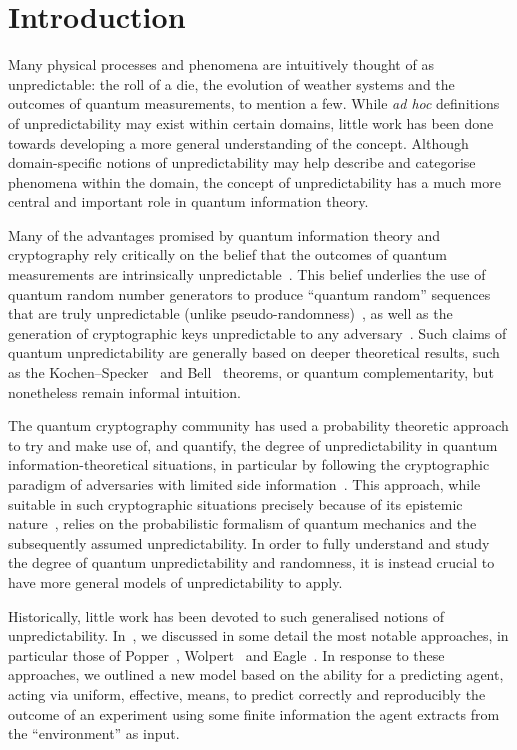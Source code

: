 \documentclass[information,article,accept,moreauthors,pdftex,12pt,a4paper]{mdpi}
\theoremstyle{mdpi}
\newcounter{ex}
\newcounter{re}
\theoremstyle{mdpidefinition}
\begin{document}
\section{Introduction}

Many physical processes and phenomena are intuitively thought of as unpredictable: the roll of a die, the evolution of weather systems and the outcomes of quantum measurements, to mention a few.
While \emph{ad hoc} definitions of unpredictability may exist within certain domains, little work has been done towards developing a more general understanding of the concept.
Although domain-specific notions of unpredictability may help describe and categorise phenomena within the domain, the concept of unpredictability has a much more central and important role in quantum information theory.


Many of the advantages promised by quantum information theory and cryptography rely critically on the belief that the outcomes of quantum measurements are intrinsically unpredictable~\cite{zeil-05_nature_ofQuantum,Fitzsimons:2013kk}.
This belief underlies the use of quantum random number generators to produce ``quantum random'' sequences that are truly unpredictable (unlike pseudo-randomness)~\cite{stefanov-2000}, as well as the generation of cryptographic keys unpredictable to any adversary~\cite{Fitzsimons:2013kk}.
Such claims of quantum unpredictability are generally based on deeper theoretical results, such as the Kochen--Specker~\cite{kochen1} and Bell~\cite{bell-66} theorems, or quantum complementarity, but nonetheless remain informal intuition.

The quantum cryptography community has used a probability theoretic approach to try and make use of, and quantify, the degree of unpredictability in quantum information-theoretical situations, in particular by following the cryptographic paradigm of adversaries with limited side information~\cite{Berta:2010vn}.
This approach, while suitable in such cryptographic situations precisely because of its epistemic nature~\cite{dynes:031109}, relies on the probabilistic formalism of quantum mechanics and the subsequently assumed unpredictability.
In order to fully understand and study the degree of quantum unpredictability and randomness, it is instead crucial to have more general models of unpredictability to apply.

Historically, little work has been devoted to such generalised notions of unpredictability.
In~\cite{DBLP:conf/birthday/AbbottCS15}, we discussed in some detail the most notable approaches, in particular those of Popper~\cite{popper-50i}, Wolpert~\cite{Wolpert:2008aa} and Eagle~\cite{Eagle:2005ys}.
In response to these approaches, we outlined a new model based on the ability for a predicting agent, acting via uniform, effective, means, to predict correctly and reproducibly the outcome of an experiment using some finite information the agent extracts from the ``environment'' as input.
\end{document}

